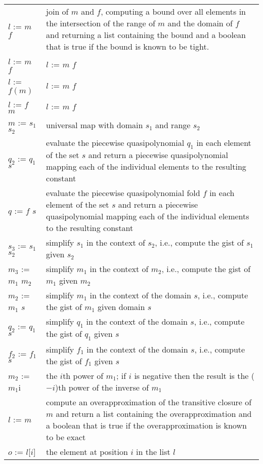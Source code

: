 \begin{supertabular}{p{0.35\textwidth}p{0.6\textwidth}}
\\
$l$ := $m$  $f$ & join of $m$ and $f$, computing a bound
over all elements in the intersection of the range of $m$ and the domain
of $f$ and returning a list containing the bound
and a boolean that is true if the bound is known to be tight.
\\
$l$ := $m$  $f$ & $l$ := $m$  $f$
\\
$l$ := $f(m)$ & $l$ := $m$  $f$
\\
$l$ := $f$  $m$ & $l$ := $m$  $f$
\\
$m$ := $s_1$ \ai[\tt]{->} $s_2$ & universal map with domain $s_1$
and range $s_2$
\\
$q_2$ := $q_1$  $s$ &
evaluate the piecewise quasipolynomial $q_1$ in each element
of the set $s$ and return a piecewise quasipolynomial
mapping each of the individual elements to the resulting
constant
\\
$q$ := $f$  $s$ &
evaluate the piecewise quasipolynomial fold $f$ in each element
of the set $s$ and return a piecewise quasipolynomial
mapping each of the individual elements to the resulting
constant
\\
$s_3$ := $s_1$ \ai[\tt]{\%} $s_2$ &
simplify $s_1$ in the context of $s_2$, i.e., compute
the gist of $s_1$ given $s_2$
\\
$m_3$ := $m_1$ \ai[\tt]{\%} $m_2$ &
simplify $m_1$ in the context of $m_2$, i.e., compute
the gist of $m_1$ given $m_2$
\\
$m_2$ := $m_1$ \ai[\tt]{\%} $s$ &
simplify $m_1$ in the context of the domain $s$, i.e., compute
the gist of $m_1$ given domain $s$
\\
$q_2$ := $q_1$ \ai[\tt]{\%} $s$ &
simplify $q_1$ in the context of the domain $s$, i.e., compute
the gist of $q_1$ given $s$
\\
$f_2$ := $f_1$ \ai[\tt]{\%} $s$ &
simplify $f_1$ in the context of the domain $s$, i.e., compute
the gist of $f_1$ given $s$
\\
$m_2$ := $m_1$\ai[\tt]{\^{}}i & the $i$th power of $m_1$;
if $i$ is negative then the result is the ($-i$)th power of the inverse
of $m_1$
\\
$l$ := $m$\ai[\tt]{\^{}+} &
compute an overapproximation of the transitive closure
of $m$ and return a list containing the overapproximation
and a boolean that is true if the overapproximation
is known to be exact
\\
$o$ := $l$[$i$] &
the element at position $i$ in the list $l$
\\

\end{supertabular}
